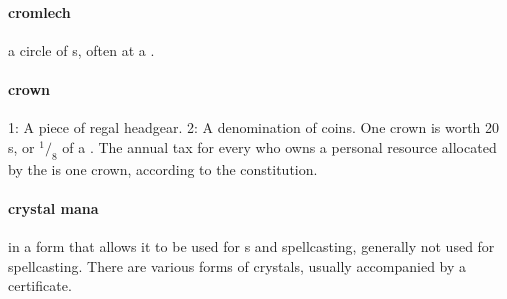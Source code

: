 \paragraph{cromlech}  a circle of s, often at a .
\paragraph{crown} 1: A piece of regal headgear. 2: A denomination of coins. One crown is worth 20 s, or $^1/_8$ of a . The annual tax for every  who owns a personal resource allocated by the  is one crown, according to the constitution.
\paragraph{crystal mana}  in a form that allows it to be used for s and spellcasting, generally not used for spellcasting. There are various forms of crystals, usually accompanied by a certificate.
